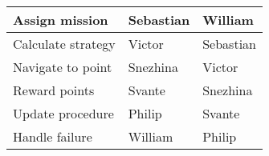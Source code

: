 \begin{table}[]
\begin{tabular}{@{}lll@{}}
\toprule
Assign mission     & Sebastian & William   \\ \midrule
Calculate strategy & Victor    & Sebastian \\
Navigate to point  & Snezhina  & Victor    \\
Reward points      & Svante    & Snezhina  \\
Update procedure   & Philip    & Svante    \\
Handle failure     & William   & Philip    \\ \bottomrule
\end{tabular}
\end{table}